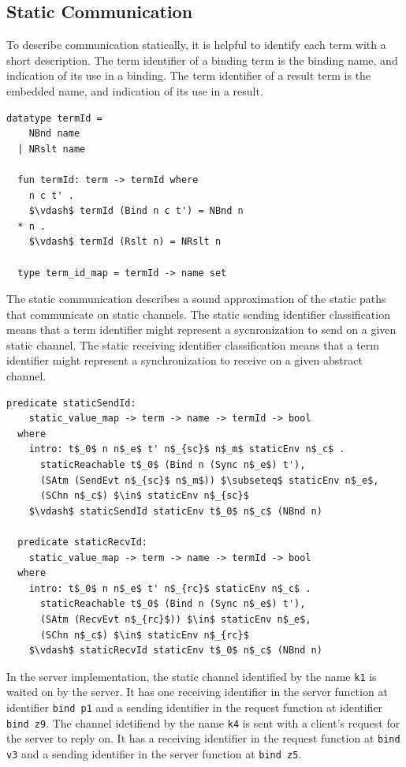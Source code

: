 \documentclass[letterpaper, 11pt]{extarticle}
\begin{document}
\subsection{Static Communication}
To describe communication statically, it is helpful to identify each term with a short description.
The term identifier of a binding term is the binding name, and indication of its use in a binding.
The term identifier of a result term is the embedded name, and indication of its use in a result.

\begin{lstlisting}[language=logic, mathescape]
  datatype termId =
    NBnd name
  | NRslt name 

  fun termId: term -> termId where
    n c t' . 
    $\vdash$ termId (Bind n c t') = NBnd n
  * n . 
    $\vdash$ termId (Rslt n) = NRslt n

  type term_id_map = termId -> name set
\end{lstlisting}

The static communication describes a sound approximation of
the static paths that communicate on static channels.
The static sending identifier classification means that a term identifier might represent a
sycnronization to send on a given static channel.
The static receiving identifier classification means that a term identifier might represent a
synchronization to receive on a given abstract channel. 

\begin{lstlisting}[language=logic, mathescape]
  predicate staticSendId:
    static_value_map -> term -> name -> termId -> bool 
  where
    intro: t$_0$ n n$_e$ t' n$_{sc}$ n$_m$ staticEnv n$_c$ .
      staticReachable t$_0$ (Bind n (Sync n$_e$) t'),
      (SAtm (SendEvt n$_{sc}$ n$_m$)) $\subseteq$ staticEnv n$_e$, 
      (SChn n$_c$) $\in$ staticEnv n$_{sc}$
    $\vdash$ staticSendId staticEnv t$_0$ n$_c$ (NBnd n)

  predicate staticRecvId:
    static_value_map -> term -> name -> termId -> bool
  where
    intro: t$_0$ n n$_e$ t' n$_{rc}$ staticEnv n$_c$ .
      staticReachable t$_0$ (Bind n (Sync n$_e$) t'),
      (SAtm (RecvEvt n$_{rc}$)) $\in$ staticEnv n$_e$, 
      (SChn n$_c$) $\in$ staticEnv n$_{rc}$ 
    $\vdash$ staticRecvId staticEnv t$_0$ n$_c$ (NBnd n)
\end{lstlisting}


In the server implementation,
the static channel identified by the name \lstinline{k1} is waited on
by the server. It has one receiving identifier in the server function
at identifier \lstinline[language=sugar_lang]{bind p1} and a sending identifier 
in the request function at identifier \lstinline[language=sugar_lang]{bind z9}.
The channel idetifiend by the name \lstinline{k4} is sent with a client's request for
the server to reply on. It has a receiving identifier in the request function at
\lstinline[language=sugar_lang]{bind v3} and a sending identifier in the server function at
\lstinline[language=sugar_lang]{bind z5}.
\end{document}
